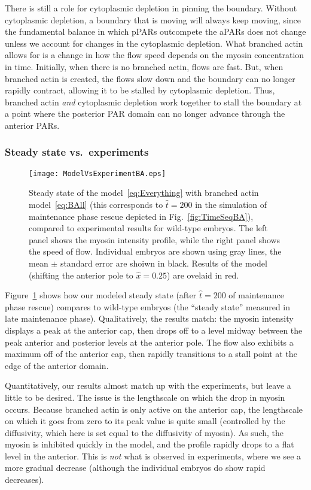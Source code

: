 \documentclass[11pt]{article}
\newcommand{\red}[1]{\color{red}#1\normalcolor}
\newcommand{\6}[1]{#1_{\text{6}}}
\newcommand{\3}[1]{#1_{\text{3}}}
\begin{document}
There is still a role for cytoplasmic depletion in pinning the boundary. Without cytoplasmic depletion, a boundary that is moving will always keep moving, since the fundamental balance in which pPARs outcompete the aPARs does not change unless we account for changes in the cytoplasmic depletion. What branched actin allows for is a change in how the flow speed depends on the myosin concentration in time. Initially, when there is no branched actin, flows are fast. But, when branched actin is created, the flows slow down and the boundary can no longer rapidly contract, allowing it to be stalled by cytoplasmic depletion. Thus, branched actin \emph{and} cytoplasmic depletion work together to stall the boundary at a point where the posterior PAR domain can no longer advance through the anterior PARs.


\subsubsection{Steady state vs.\ experiments}

\begin{figure}
\centering
\texttt{[image: ModelVsExperimentBA.eps]}
\caption{\label{fig:StStBA}Steady state of the model\ \eqref{eq:Everything} with branched actin model\ \eqref{eq:BAll} (this corresponds to $\hat t = 200$ in the simulation of maintenance phase rescue depicted in Fig.\ \ref{fig:TimeSeqBA}), compared to experimental results for wild-type embryos. The left panel shows the myosin intensity profile, while the right panel shows the speed of flow. Individual embryos are shown using gray lines, the mean $\pm$ standard error are shoiwn in black. Results of the model (shifting the anterior pole to $\hat x = 0.25$) are ovelaid in red.}
\end{figure}

Figure\ \ref{fig:StStBA} shows how our modeled steady state (after $\hat t = 200$ of maintenance phase rescue) compares to wild-type embryos (the ``steady state'' measured in late maintenance phase). Qualitatively, the results match: the myosin intensity displays a peak at the anterior cap, then drops off to a level midway between the peak anterior and posterior levels at the anterior pole. The flow also exhibits a maximum off of the anterior cap, then rapidly transitions to a stall point at the edge of the anterior domain.

\red{Quantitatively, our results almost match up with the experiments, but leave a little to be desired. The issue is the lengthscale on which the drop in myosin occurs. Because branched actin is only active on the anterior cap, the lengthscale on which it goes from zero to its peak value is quite small (controlled by the diffusivity, which here is set equal to the diffusivity of myosin). As such, the myosin is inhibited quickly in the model, and the profile rapidly drops to a flat level in the anterior. This is \emph{not} what is observed in experiments, where we see a more gradual decrease (although the individual embryos do show rapid decreases).}




\end{document}
